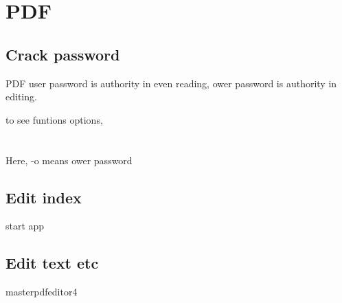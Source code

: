 \chapter{PDF}


\section{Crack password}

PDF user password is authority in even reading, ower password is authority in editing.


 to see funtions options, \\

\\

\\
Here, -o means ower password 

\section{Edit index}

 start app

\section{Edit text etc}

masterpdfeditor4



